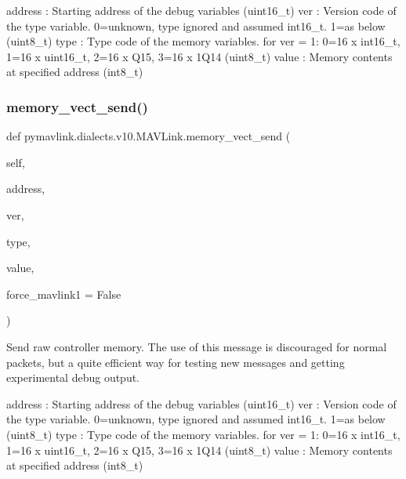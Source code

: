 \begin{DoxyVerb}
\begin{DoxyVerb}
\begin{DoxyVerb}
\begin{DoxyVerb}
\begin{DoxyVerb}
address                   : Starting address of the debug variables (uint16_t)
ver                       : Version code of the type variable. 0=unknown, type ignored and assumed int16_t. 1=as below (uint8_t)
type                      : Type code of the memory variables. for ver = 1: 0=16 x int16_t, 1=16 x uint16_t, 2=16 x Q15, 3=16 x 1Q14 (uint8_t)
value                     : Memory contents at specified address (int8_t)\end{DoxyVerb}
 \mbox{\label{classpymavlink_1_1dialects_1_1v10_1_1MAVLink_a2ae1e2033e0b4022ca5fe0fbb09c683e}} 
\subsubsection{\texorpdfstring{memory\+\_\+vect\+\_\+send()}{memory\_vect\_send()}}
{\footnotesize\ttfamily def pymavlink.\+dialects.\+v10.\+M\+A\+V\+Link.\+memory\+\_\+vect\+\_\+send (\begin{DoxyParamCaption}\item[{}]{self,  }\item[{}]{address,  }\item[{}]{ver,  }\item[{}]{type,  }\item[{}]{value,  }\item[{}]{force\+\_\+mavlink1 = {\ttfamily False} }\end{DoxyParamCaption})}

\begin{DoxyVerb}Send raw controller memory. The use of this message is discouraged for
normal packets, but a quite efficient way for testing
new messages and getting experimental debug output.

address                   : Starting address of the debug variables (uint16_t)
ver                       : Version code of the type variable. 0=unknown, type ignored and assumed int16_t. 1=as below (uint8_t)
type                      : Type code of the memory variables. for ver = 1: 0=16 x int16_t, 1=16 x uint16_t, 2=16 x Q15, 3=16 x 1Q14 (uint8_t)
value                     : Memory contents at specified address (int8_t)\end{DoxyVerb}
 \mbox{\label{classpymavlink_1_1dialects_1_1v10_1_1MAVLink_a19f009fc0c74ac62c78846c0595c4522}} 

\end{DoxyVerb}
\end{DoxyVerb}
\end{DoxyVerb}
\end{DoxyVerb}
